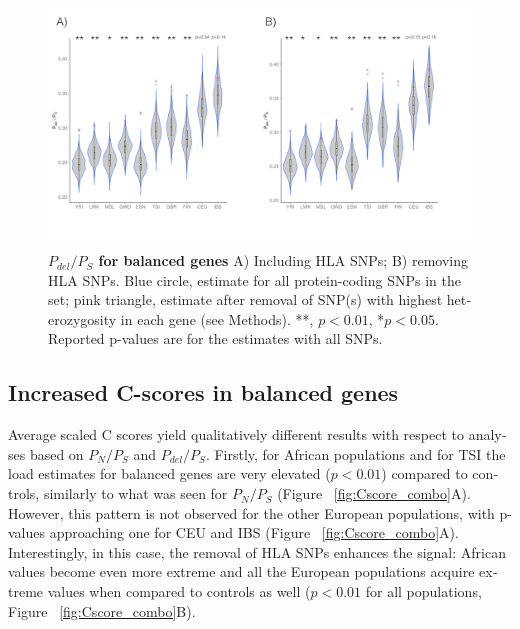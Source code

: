 \begin{refsection}
\begin{otherlanguage}{english}
\begin{figure}
\includegraphics[]{chap3_folder/figures/PdelPs_combo2.png}
\caption{\textbf{$P_{del}/P_{S}$ for balanced genes} A) Including HLA SNPs; B) removing HLA SNPs. Blue circle, estimate for all protein-coding SNPs in the set; pink triangle, estimate after removal of SNP(s) with highest heterozygosity in each gene (see Methods). **, $p<0.01$, *$p<0.05$. Reported p-values are for the estimates with all SNPs.}
\label{fig:PdelPs_combo}
\end{figure}


\afterpage{\FloatBarrier}
\subsection{Increased C-scores in balanced genes} 

Average scaled C scores yield qualitatively different results with respect to analyses based on $P_{N}/P_{S}$ and $P_{del}/P_{S}$. Firstly, for African populations and for TSI the load estimates for balanced genes are very elevated ($p<0.01$) compared to controls, similarly to what was seen for $P_{N}/P_{S}$ (Figure ~\ref{fig:Cscore_combo}A). However, this pattern is not observed for the other European populations, with p-values approaching one for CEU and IBS (Figure ~\ref{fig:Cscore_combo}A). Interestingly, in this case, the removal of HLA SNPs enhances the signal: African values become even more extreme and all the European populations acquire extreme values when compared to controls as well ($p<0.01$ for all populations, Figure ~\ref{fig:Cscore_combo}B).



\end{otherlanguage}
\end{refsection}
